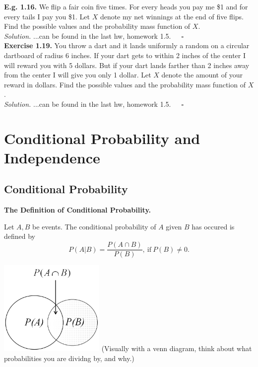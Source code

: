 \documentclass[12pt]{book}
\begin{document}
\noindent \textbf{E.g. 1.16. } We flip a fair coin five times. For every heads you pay me \$1 and for every tails I pay you \$1. Let $X$ denote my net winnings at the end of five flips. Find the possible values and the probability mass function of $X$.\\
\textit{Solution.} ...can be found in the last hw, homework 1.5.~~~$\square$\\

\noindent \textbf{Exercise 1.19. } You throw a dart and it lands uniformly a random on a circular dartboard of radius 6 inches. If your dart gets to within 2 inches of the center I will reward you with 5 dollars. But if your dart lands farther than 2 inches away from the center I will give you only 1 dollar. Let $X$ denote the amount of your reward in dollars. Find the possible values and the probability mass function of $X$.\\
\textit{Solution.} ...can be found in the last hw, homework 1.5.~~~$\square$





\chapter{Conditional Probability and Independence}
\section{Conditional Probability}
\textbf{The Definition of Conditional Probability.}
\begin{center}
Let $A,B$ be events. The conditional probability of $A$ given $B$ has occured is defined by
$$P(A|B)=\frac{P(A\cap B)}{P(B)},~\text{if}~P(B)\neq0.$$
\end{center}

\includegraphics[width=2in]{Conditional Prob Venn Diagram.png}
(Visually with a venn diagram, think about what probabilities you are dividng by, and why.)
\newpage
\end{document}
